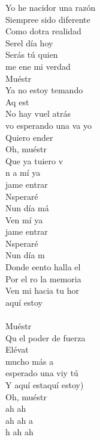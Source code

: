 \begin{cancion}
	Yo he nacidor una razón\\
	Siempree sido diferente	\\
	Como dotra realidad\\
	Serel día hoy\\
Serás tú quien\\
	me ene mi verdad  \\
	Muéstr   \\
	Ya no estoy temando\\
	Aq est\\
	No hay vuel atrás\\
	vo esperando una va yo\\
	Quiero ender       \\
	Oh, muéstr   \\
	Que ya tuiero v\\
	n a mí ya\\
	jame entrar \\
	Nsperaré\\
	Nun día má\\
	Ven mí ya\\
	jame entrar \\
	Nsperaré\\
	Nun día m         \\
	Donde eento halla el\\
	Por el ro la memoria\\
	Ven mi hacia tu hor\\
aquí estoy\\
	\jump\\
	Muéstr    \\
	Qu el poder de fuerza\\
	Elévat    \\
	mucho más a \\
	 esperado una viy tú\\
	Y aquí estaquí estoy)         \\
	Oh, muéstr   \\
	ah ah\\
	ah ah a\\
	h ah ah\\
\end{cancion}%
